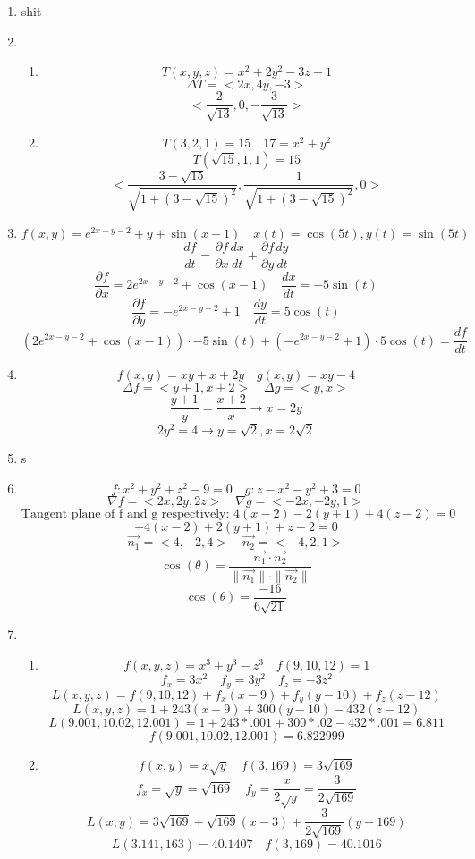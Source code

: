 \documentclass[12pt]{article}
\begin{document}
\maketitle \begin{enumerate}

\item shit

\item \begin{enumerate}
\item 
$$T(x, y, z) = x^2 +2y^2 - 3z + 1$$
$$\Delta T  = <2x, 4y, -3>$$
$$<\frac{2}{\sqrt{13}}, 0, -\frac{3}{\sqrt{13}}>$$
\item $$T(3, 2, 1) = 15 \quad 17 = x^2 + y^2$$
$$T(\sqrt{15},1, 1) = 15$$
$$<\frac{3-\sqrt{15}}{\sqrt{1+(3-\sqrt{15})^2}}, \frac{1}{\sqrt{1+(3-\sqrt{15})^2}}, 0>$$
\end{enumerate}

\item $$f(x, y) = e^{2x-y-2}+y+\sin(x-1) \quad x(t) = \cos (5t), y(t) = \sin (5t)$$
$$\frac{df}{dt} = \frac{\partial f}{\partial x} \frac{dx}{dt} + \frac{\partial f}{\partial y} \frac{dy}{dt}$$
$$\frac{\partial f}{\partial x} = 2e^{2x-y-2}+\cos(x-1) \quad \frac{dx}{dt} = -5\sin(t)$$
$$\frac{\partial f}{\partial y} = -e^{2x-y-2}+1 \quad \frac{dy}{dt} = 5\cos(t)$$
$$\left(2e^{2x-y-2}+\cos(x-1)\right)\cdot-5\sin(t) + \left(-e^{2x-y-2}+1\right)\cdot5\cos(t) = \frac{df}{dt}$$

\item $$f(x, y) = xy + x + 2y \quad g(x, y) = xy - 4$$
$$\Delta f = <y+1,x+2> \quad \Delta g = <y, x>$$
$$\frac{y+1}{y} = \frac{x+2}{x} \rightarrow x=2y$$
$$2y^2=4 \rightarrow y=\sqrt{2}, x = 2\sqrt{2}$$

\item s
\item $$f:x^2+y^2+z^2-9=0 \quad g:z-x^2-y^2+3=0$$
$$\nabla f = <2x,2y,2z> \quad \nabla g = <-2x,-2y,1>$$
$$\textrm{Tangent plane of f and g respectively: } 4(x-2)-2(y+1)+4(z-2)=0$$
$$-4(x-2)+2 (y+1)+z-2=0$$
$$\vec{n_1} = <4,-2,4> \quad \vec{n_2} = <-4, 2,1>$$
$$\cos(\theta) = \frac{\vec{n_1} \cdot \vec{n_2}}{\parallel \vec{n_1} \parallel \cdot \parallel \vec{n_2} \parallel}$$
$$\cos(\theta) = \frac{-16}{6\sqrt{21}}$$
\item \begin{enumerate}
\item $$f\left(x,y,z\right)=x^3+y^3-z^3 \quad f\left(9,10,12\right) = 1$$
$$f_x = 3x^2 \quad f_y = 3y^2 \quad f_z = -3z^2$$
$$L(x,y,z) = f(9,10,12) + f_x(x-9)+f_y(y-10)+f_z(z-12)$$
$$L(x,y,z) = 1 + 243(x-9)+300(y-10)-432(z-12)$$
$$L(9.001,10.02,12.001)=1+243*.001+300*.02-432*.001=6.811$$
$$f(9.001,10.02,12.001)=6.822999$$
\item $$f(x,y)=x\sqrt{y} \quad f(3,169)=3\sqrt{169}$$
$$f_x=\sqrt{y}=\sqrt{169} \quad f_y=\frac{x}{2\sqrt{y}}=\frac{3}{2\sqrt{169}}$$
$$L(x,y) = 3\sqrt{169} + \sqrt{169}(x-3) + \frac{3}{2\sqrt{169}}(y-169)$$
$$L(3.141,163)=40.1407 \quad f(3,169)=40.1016$$
\end{enumerate}


\end{enumerate}
\end{document}
